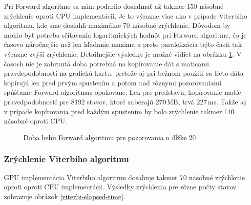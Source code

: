 \documentclass[11pt,a4paper]{article}
\begin{document}
Pri Forward algoritme sa nám podarilo dosiahnuť až takmer 150 násobné zrýchlenie oproti CPU implementácii. Je to výrazne viac ako v prípade Viterbiho algoritmu, kde sme dosiahli maximálne 70 násobné zrýchlenie. Dôvodom by mohlo byť potreba sčítavania logaritmických hodnôt pri Forward algoritme, čo je časovo náročnejšie než len hľadanie maxima a preto paralelizácia tejto časti tak výrazne zvýši zrýchlenie. Detailnejšie výsledky je možné vidieť na obrázku \ref{forward-elapsed-time}. V časoch nie je zahrnutá doba potrebná na kopírovanie dát s maticami pravdepodobností na grafickú kartu, pretože aj pri bežnom použití sa tieto dáta kopírujú len pred prvým spustením a potom nad rôznymi pozorovaniami spúšťame Forward algoritmus opakovane. Len pre predstavu, kopírovanie matíc pravedpodobností pre 8192 stavov, ktoré zaberajú 270\,MB, trvá 227\,ms. Takže aj v prípade kopírovania pred každým spustením by bolo zrýchlenie takmer 140 násobné oproti CPU.

\begin{figure}[!ht]
  \centering
  \caption{Doba behu Forward algoritmu pre pozorovania o dĺžke 20} \label{forward-elapsed-time}
\end{figure}

\newpage

\subsubsection{Zrýchlenie Viterbiho algoritmu}

GPU implementácia Viterbiho algoritmu dosahuje takmer 70 násobné zrýchlenie oproti oproti CPU implementácii. Výsledky zrýchlenia pre rôzne počty stavov zobrazuje obrázok \ref{viterbi-elapsed-time}.
\end{document}
